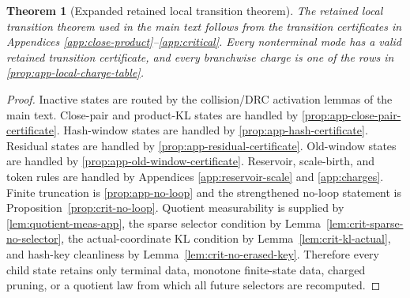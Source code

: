 \documentclass[11pt]{article}
\newcommand{\Cref}[1]{\ref{#1}}
\newtheorem{theorem}{Theorem}[section]
\theoremstyle{remark}
\begin{document}
\begin{theorem}[Expanded retained local transition theorem]\label{thm:app-expanded-local}
The retained local transition theorem used in the main text follows from the transition certificates in Appendices \ref{app:close-product}--\ref{app:critical}.  Every nonterminal mode has a valid retained transition certificate, and every branchwise charge is one of the rows in \Cref{prop:app-local-charge-table}.
\end{theorem}

\begin{proof}
Inactive states are routed by the collision/DRC activation lemmas of the main text.  Close-pair and product-KL states are handled by \Cref{prop:app-close-pair-certificate}.  Hash-window states are handled by \Cref{prop:app-hash-certificate}.  Residual states are handled by \Cref{prop:app-residual-certificate}.  Old-window states are handled by \Cref{prop:app-old-window-certificate}.  Reservoir, scale-birth, and token rules are handled by Appendices \ref{app:reservoir-scale} and \ref{app:charges}.  Finite truncation is \Cref{prop:app-no-loop} and the strengthened no-loop statement is Proposition~\ref{prop:crit-no-loop}.  Quotient measurability is supplied by \Cref{lem:quotient-meas-app}, the sparse selector condition by Lemma~\ref{lem:crit-sparse-no-selector}, the actual-coordinate KL condition by Lemma~\ref{lem:crit-kl-actual}, and hash-key cleanliness by Lemma~\ref{lem:crit-no-erased-key}.  Therefore every child state retains only terminal data, monotone finite-state data, charged pruning, or a quotient law from which all future selectors are recomputed.
\end{proof}
\end{document}
